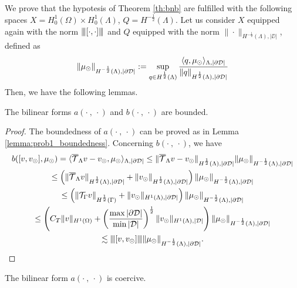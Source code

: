 We prove that the hypotesis of  Theorem \ref{th:bnb} are fulfilled with the following spaces $X=H^1_0(\Omega) \times H^1_0(\Lambda)$, $Q=H^{-\frac 12}(\Lambda)$.
Let us consider $X$ equipped again with the norm ${\left\vert\kern-0.25ex\left\vert\kern-0.25ex\left\vert [\cdot,\cdot ] \right\vert\kern-0.25ex\right\vert\kern-0.25ex\right\vert}$ and  
$Q$ equipped with the norm $\|\cdot \|_{H^{-\frac 12}(\Lambda),|\DD|}$, defined as
\begin{equation*}
\|\mu_{\odot} \|_{H^{-\frac 12}(\Lambda),|\partial\mathcal{D}|}:= \sup_{q\in H^{\frac 12}(\Lambda)}\frac{\langle q, \mu_{\odot}\rangle_{\Lambda, |\partial\mathcal{D}|}}{\|q\|_{H^{\frac 12}(\Lambda),|\partial\mathcal{D}|}}
\end{equation*}
Then, we have the following lemmas.
\begin{lemma}
The bilinear forms $a(\cdot \ , \ \cdot)$ and $b(\cdot \ , \ \cdot)$ are bounded.
\end{lemma}
\begin{proof}
The boundedness of $a(\cdot \ , \ \cdot)$ can be proved as in Lemma \ref{lemma:prob1_boundedness}. Concerning $b(\cdot \ , \ \cdot)$, we have
\begin{multline*}
b([v, v_{\odot}], \mu_{\odot})=  \langle  {\overline{\mathcal{T}}_\Lambda} v - v_{\odot}, \mu_{\odot} \rangle_{\Lambda, |\partial\mathcal{D}|} 
\leq \|{\overline{\mathcal{T}}_\Lambda} v - v_{\odot}\|_{H^{\frac 12 }(\Lambda), |\partial\mathcal{D}|}\|\mu_{\odot}\|_{H^{-\frac 12}(\Lambda),|\partial\mathcal{D}|}\\
\leq \left(\|{\overline{\mathcal{T}}_\Lambda} v\|_{H^{\frac 12 }(\Lambda), |\partial\mathcal{D}|}+\|v_{\odot}\|_{H^{\frac 12 }(\Lambda), |\partial\mathcal{D}|}\right)\|\mu_{\odot}\|_{H^{-\frac 12}(\Lambda),|\partial\mathcal{D}|} \\
\leq \left(\|{\mathcal{T}_\Gamma} v\|_{H^{\frac 12 }(\Gamma)}+ \|v_{\odot}\|_{H^1(\Lambda), |\partial\mathcal{D}|}\right)\|\mu_{\odot}\|_{H^{-\frac 12}(\Lambda),|\partial\mathcal{D}|} \\
\leq \left(C_T\|v\|_{H^1(\Omega)}+ \left(\frac{\max |\partial\mathcal{D}|}{\min |\mathcal{D}|}\right)^{\frac 12} \|v_{\odot}\|_{H^1(\Lambda), |\mathcal{D}|}\right) \|\mu_{\odot}\|_{H^{-\frac 12}(\Lambda),|\partial\mathcal{D}|} \\
\lesssim {\left\vert\kern-0.25ex\left\vert\kern-0.25ex\left\vert [v,v_{\odot}] \right\vert\kern-0.25ex\right\vert\kern-0.25ex\right\vert}\|\mu_{\odot}\|_{H^{-\frac 12}(\Lambda),|\partial\mathcal{D}|}.
\end{multline*} 
\end{proof}

\begin{lemma}\label{lemma:prob2_coercivity}
The bilinear form $a(\cdot \ , \ \cdot)$ is coercive.
\end{lemma}

